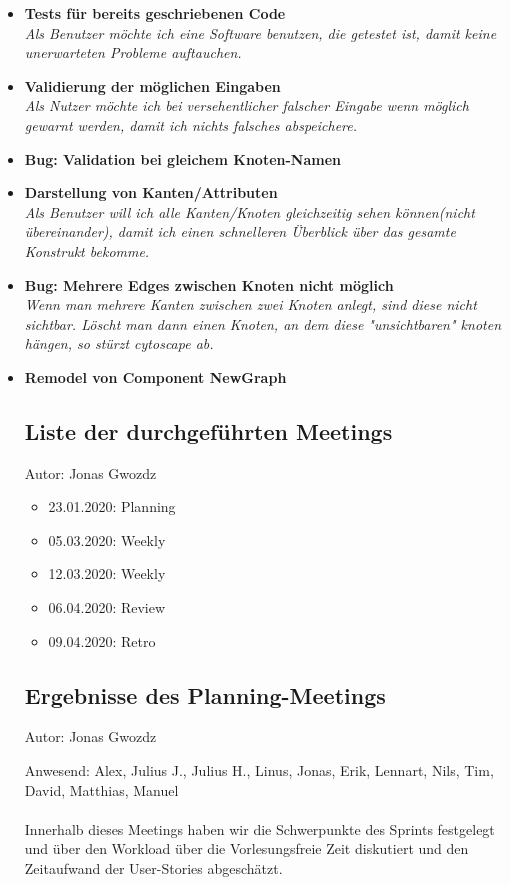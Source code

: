 \begin{itemize}
  \item \textbf{Tests für bereits geschriebenen Code}
        \\\textit{Als Benutzer möchte ich eine Software benutzen, die getestet ist, damit keine unerwarteten Probleme auftauchen.}
  \item \textbf{ Validierung der möglichen Eingaben }
        \\\textit{
          Als Nutzer möchte ich bei versehentlicher falscher Eingabe wenn möglich gewarnt werden, damit ich nichts falsches abspeichere.}
  \item \textbf{Bug: Validation bei gleichem Knoten-Namen}
  \item \textbf{Darstellung von Kanten/Attributen }
        \\\textit{
          Als Benutzer will ich alle Kanten/Knoten gleichzeitig sehen können(nicht übereinander), damit ich einen schnelleren Überblick über das gesamte Konstrukt bekomme.}
  \item \textbf{Bug: Mehrere Edges zwischen Knoten nicht möglich}
        \\\textit{
          Wenn man mehrere Kanten zwischen zwei Knoten anlegt, sind diese nicht sichtbar. Löscht man dann einen Knoten, an dem diese "unsichtbaren" knoten hängen, so stürzt cytoscape ab.}
  \item \textbf{Remodel von Component NewGraph}

\subsection{Liste der durchgeführten Meetings}
{\small Autor: Jonas Gwozdz}

\begin{itemize}
\item 23.01.2020: Planning
\item 05.03.2020: Weekly
\item 12.03.2020: Weekly
\item 06.04.2020: Review
\item 09.04.2020: Retro
\end{itemize}

\subsection{Ergebnisse des Planning-Meetings}
{\small Autor: Jonas Gwozdz}

Anwesend: Alex, Julius J., Julius H., Linus, Jonas, Erik, Lennart, Nils, Tim, David, Matthias, Manuel\\
\\
Innerhalb dieses Meetings haben wir die Schwerpunkte des Sprints festgelegt und über den Workload über die Vorlesungsfreie Zeit diskutiert und den Zeitaufwand der User-Stories abgeschätzt.\\



\end{itemize}
